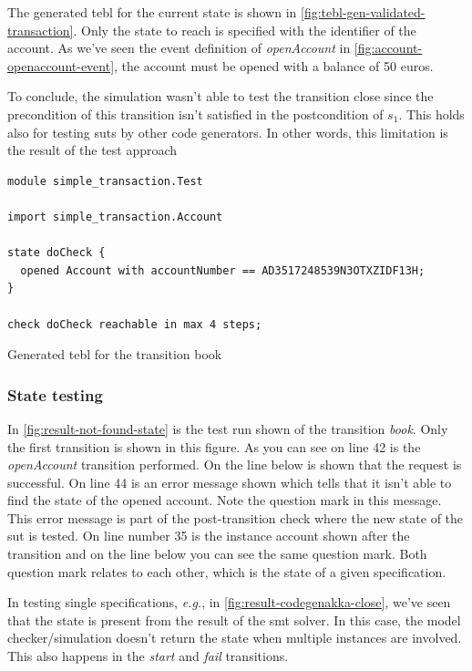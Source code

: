 The generated tebl for the current state is shown in
\autoref{fig:tebl-gen-validated-transaction}. Only the state to reach is
specified with the identifier of the account. As we've seen the event definition
of \textit{openAccount} in \autoref{fig:account-openaccount-event}, the account
must be opened with a balance of 50 euros.

To conclude, the simulation wasn't able to test the transition close since the
precondition of this transition isn't satisfied in the postcondition of $s_{1}$.
This holds also for testing \gls{sut}s by other code generators. In other
words, this limitation is the result of the test approach

\begin{sourcecode}[h!]
\begin{lstlisting}[]
module simple_transaction.Test

import simple_transaction.Account

state doCheck {
  opened Account with accountNumber == AD3517248539N3OTXZIDF13H;
}

check doCheck reachable in max 4 steps;
\end{lstlisting}
\caption{Generated tebl for the transition book}\label{fig:tebl-gen-validated-transaction}
\end{sourcecode}
\FloatBarrier

\subsubsection{State testing}

In \autoref{fig:result-not-found-state} is the test run shown of the transition
\textit{book}. Only the first transition is shown in this figure. As you can
see on line 42 is the \textit{openAccount} transition performed. On the line
below is shown that the request is successful. On line 44 is an error message
shown which tells that it isn't able to find the state of the opened account.
Note the question mark in this message. This error message is part of the
post-transition check where the new state of the \gls{sut} is tested. On line number
35 is the instance account shown after the transition and on the line below you
can see the same question mark. Both question mark relates to each other, which
is the state of a given specification.

In testing single specifications, \textit{e.g.}, in
\autoref{fig:result-codegenakka-close}, we've seen that the state is present
from the result of the \gls{smt} solver. In this case, the model checker/simulation
doesn't return the state when multiple instances are involved. This also
happens in the \textit{start} and \textit{fail} transitions.

